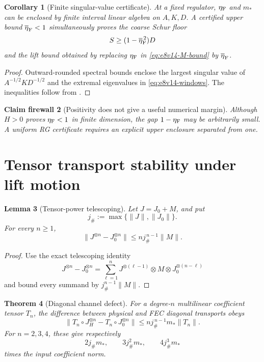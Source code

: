 \documentclass[11pt,oneside]{book}
\newtheorem{theorem}{Theorem}[chapter]
\newtheorem{lemma}[theorem]{Lemma}
\newtheorem{corollary}[theorem]{Corollary}
\newtheorem{firewall}[theorem]{Claim firewall}
\theoremstyle{definition}
\theoremstyle{remark}
\begin{document}
\begin{corollary}[Finite singular-value certificate]
\label{cor:e8v14-SVD}
At a fixed regulator, \(\eta_{\rm F}\) and \(m_*\) can be enclosed by
finite interval linear algebra on \(A,K,D\).  A certified upper bound
\(\overline\eta_{\rm F}<1\) simultaneously proves the coarse Schur
floor
\[
 S\ge(1-\overline\eta_{\rm F}^{\,2})D               \label{eq:e8v14-Schur-floor}
\]
and the lift bound obtained by replacing \(\eta_{\rm F}\) in
\eqref{eq:e8v14-M-bound} by \(\overline\eta_{\rm F}\).
\end{corollary}

\begin{proof}
Outward-rounded spectral bounds enclose the largest singular value of
\(A^{-1/2}KD^{-1/2}\) and the extremal eigenvalues in
\eqref{eq:e8v14-windows}.  The inequalities follow from
.
\end{proof}

\begin{firewall}[Positivity does not give a useful numerical margin]
\label{fire:e8v14-positive}
Although \(H>0\) proves \(\eta_{\rm F}<1\) in finite dimension, the
gap \(1-\eta_{\rm F}\) may be arbitrarily small.  A uniform RG
certificate requires an explicit upper enclosure separated from one.
\end{firewall}

\section{Tensor transport stability under lift motion}
\label{sec:e8v14-tensors}

\begin{lemma}[Tensor-power telescoping]
\label{lem:e8v14-telescope}
Let \(J=J_0+M\), and put
\[
 j_\#:=\max\{\|J\|,\|J_0\|\}.
\]
For every \(n\ge1\),
\[
 \|J^{\otimes n}-J_0^{\otimes n}\|
 \le n j_\#^{\,n-1}\|M\|.                           \label{eq:e8v14-telescope}
\]
\end{lemma}

\begin{proof}
Use the exact telescoping identity
\[
 J^{\otimes n}-J_0^{\otimes n}
 =
 \sum_{\ell=1}^n
 J^{\otimes(\ell-1)}\otimes M
 \otimes J_0^{\otimes(n-\ell)}
\]
and bound every summand by \(j_\#^{n-1}\|M\|\).
\end{proof}

\begin{theorem}[Diagonal channel defect]
\label{thm:e8v14-diagonal-defect}
For a degree-\(n\) multilinear coefficient tensor \(T_n\), the
difference between physical and FEC diagonal transports obeys
\[
 \|T_n\circ J_H^{\otimes n}
   -T_n\circ J_0^{\otimes n}\|
 \le n j_\#^{\,n-1}m_*\|T_n\|.                     \label{eq:e8v14-diagonal-defect}
\]
For \(n=2,3,4\), these give respectively
\[
 2j_\#m_*,\qquad3j_\#^2m_*,\qquad4j_\#^3m_*         \label{eq:e8v14-three-defects}
\]
times the input coefficient norm.
\end{theorem}
\end{document}
